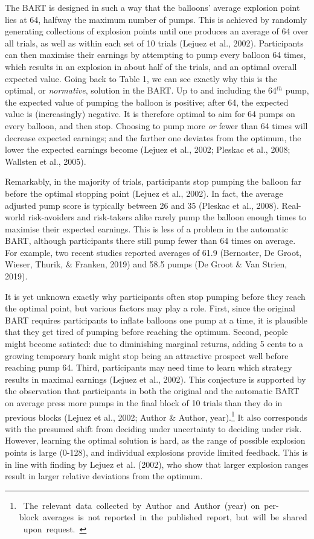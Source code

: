 \documentclass[serif, twocolumn, review]{jote-article}
\begin{document}
 The BART is designed in such a way that the balloons' average explosion point lies at 64, halfway the maximum number of pumps. This is achieved by randomly generating collections of explosion points until one produces an average of 64 over all trials, as well as within each set of 10 trials (Lejuez et al., 2002). Participants can then maximise their earnings by attempting to pump every balloon 64 times, which results in an explosion in about half of the trials, and an optimal overall expected value. Going back to Table 1, we can see exactly why this is the optimal, or \textit{normative}, solution in the BART. Up to and including the 64${}^{th}$ pump, the expected value of pumping the balloon is positive; after 64, the expected value is (increasingly) negative. It is therefore optimal to aim for 64 pumps on every balloon, and then stop. Choosing to pump more \textit{or} fewer than 64 times will decrease expected earnings; and the farther one deviates from the optimum, the lower the expected earnings become (Lejuez et al., 2002; Pleskac et al., 2008; Wallsten et al., 2005).

Remarkably, in the majority of trials, participants stop pumping the balloon far before the optimal stopping point (Lejuez et al., 2002). In fact, the average adjusted pump score is typically between 26 and 35 (Pleskac et al., 2008). Real-world risk-avoiders and risk-takers alike rarely pump the balloon enough times to maximise their expected earnings. This is less of a problem in the automatic BART, although participants there still pump fewer than 64 times on average. For example, two recent studies reported averages of 61.9 (Bernoster, De Groot, Wieser, Thurik, \& Franken, 2019) and 58.5 pumps (De Groot \& Van Strien, 2019).

It is yet unknown exactly why participants often stop pumping before they reach the optimal point, but various factors may play a role. First, since the original BART requires participants to inflate balloons one pump at a time, it is plausible that they get tired of pumping before reaching the optimum. Second, people might become satiated: due to diminishing marginal returns, adding 5 cents to a growing temporary bank might stop being an attractive prospect well before reaching pump 64. Third, participants may need time to learn which strategy results in maximal earnings (Lejuez et al., 2002). This conjecture is supported by the observation that participants in both the original and the automatic BART on average press more pumps in the final block of 10 trials than they do in previous blocks (Lejuez et al., 2002; Author \& Author, year).\footnote{\ The\ relevant\ data\ collected\ by\ Author\ and\ Author\ (year)\ on\ per-block\ averages\ is\ not\ reported\ in\ the\ published\ report,\ but\ will\ be\ shared\ upon\ request.\ } It also corresponds with the presumed shift from deciding under uncertainty to deciding under risk. However, learning the optimal solution is hard, as the range of possible explosion points is large (0-128), and individual explosions provide limited feedback. This is in line with finding by Lejuez et al. (2002), who show that larger explosion ranges result in larger relative deviations from the optimum.
\end{document}
